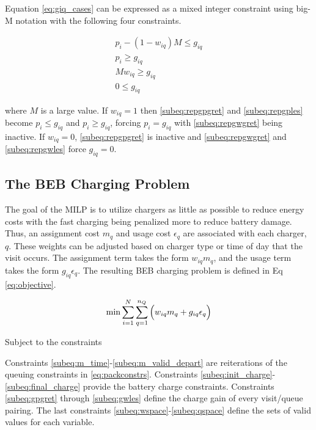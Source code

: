 \documentclass[utf8]{FrontiersinHarvard}
\begin{document}
Equation \eqref{eq:giq_cases} can be expressed as a mixed integer constraint using big-M notation with the following
four constraints.

\begin{subequations}
    \label{eq:slack_gain}
\begin{align}
    p_i - (1 - w_{iq})M \leq g_{iq}  \label{subeq:repgpgret} \\
    p_i \geq g_{iq}                 \label{subeq:repgples} \\
    Mw_{iq} \geq g_{iq}              \label{subeq:repgwgret} \\
    0 \leq g_{iq}                   \label{subeq:repgwles}
\end{align}
\end{subequations}

\noindent
where $M$ is a large value. If $w_{iq} = 1$ then \eqref{subeq:repgpgret} and \eqref{subeq:repgples} become $p_i \leq
g_{iq}$ and $p_i \geq g_{iq}$, forcing $p_i = g_{iq}$ with \eqref{subeq:repgwgret} being inactive. If $w_{iq} = 0$,
\eqref{subeq:repgpgret} is inactive and \eqref{subeq:repgwgret} and \eqref{subeq:repgwles} force $g_{iq} = 0$.

\subsection{The BEB Charging Problem} \label{sec:BEB_MILP}
The goal of the MILP is to utilize chargers as little as possible to reduce energy costs with the fast charging being
penalized more to reduce battery damage. Thus, an assignment cost $m_q$ and usage cost $\epsilon_q$ are associated with each
charger, $q$. These weights can be adjusted based on charger type or time of day that the visit occurs. The assignment
term takes the form $w_{iq}m_q$, and the usage term takes the form $g_{iq} \epsilon_q$. The resulting BEB charging problem is
defined in Eq \ref{eq:objective}.

\begin{equation}
\label{eq:objective}
	\min \sum_{i=1}^N \sum_{q=1}^{n_Q} \Big( w_{iq} m_q + g_{iq} \epsilon_q \Big) \\
\end{equation}

Subject to the constraints



Constraints \eqref{subeq:m_time}-\eqref{subeq:m_valid_depart} are reiterations of the queuing constraints in
\eqref{eq:packconstrs}. Constraints \eqref{subeq:init_charge}-\eqref{subeq:final_charge} provide the battery charge
constraints. Constraints \eqref{subeq:gpgret} through \eqref{subeq:gwles} define the charge gain of every visit/queue
pairing. The last constraints \eqref{subeq:wspace}-\eqref{subeq:qspace} define the sets of valid values for each
variable.
\end{document}
